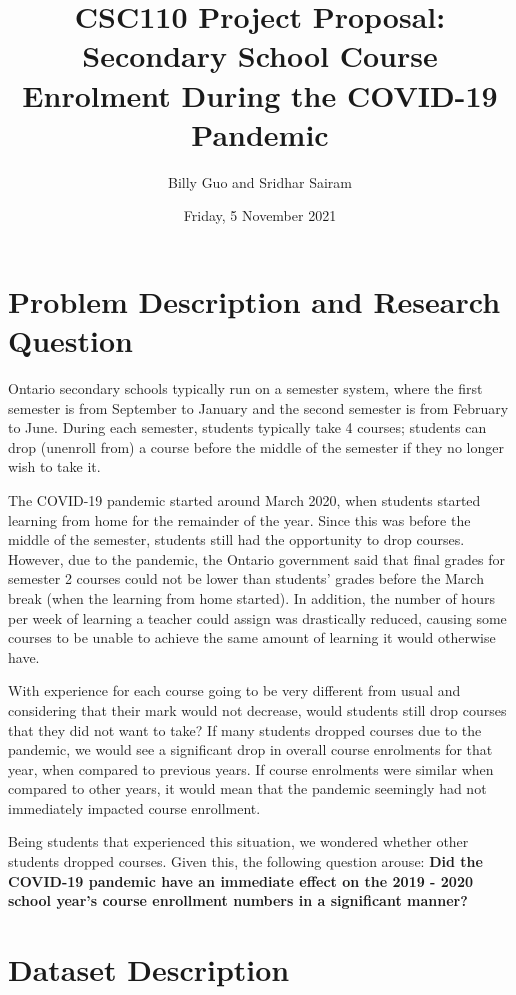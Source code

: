 \documentclass[fontsize=11pt]{article}
\title{CSC110 Project Proposal: Secondary School Course Enrolment During the COVID-19 Pandemic}
\author{Billy Guo and Sridhar Sairam}
\date{Friday, 5 November 2021}
\begin{document}
\maketitle

\section*{Problem Description and Research Question}  %

Ontario secondary schools typically run on a semester system, where the first semester is from September to January and the second semester is from February to June. During each semester, students typically take 4 courses; students can drop (unenroll from) a course before the middle of the semester if they no longer wish to take it.

The COVID-19 pandemic started around March 2020, when students started learning from home for the remainder of the year. Since this was before the middle of the semester, students still had the opportunity to drop courses. However, due to the pandemic, the Ontario government said that final grades for semester 2 courses could not be lower than students’ grades before the March break (when the learning from home started). In addition, the number of hours per week of learning a teacher could assign was drastically reduced, causing some courses to be unable to achieve the same amount of learning it would otherwise have.

With experience for each course going to be very different from usual and considering that their mark would not decrease, would students still drop courses that they did not want to take? If many students dropped courses due to the pandemic, we would see a significant drop in overall course enrolments for that year, when compared to previous years. If course enrolments were similar when compared to other years, it would mean that the pandemic seemingly had not immediately impacted course enrollment.

Being students that experienced this situation, we wondered whether other students dropped courses. Given this, the following question arouse:
\textbf{Did the COVID-19 pandemic have an immediate effect on the 2019 - 2020 school year’s course enrollment numbers in a significant manner?}

\section*{Dataset Description}  %
\end{document}
